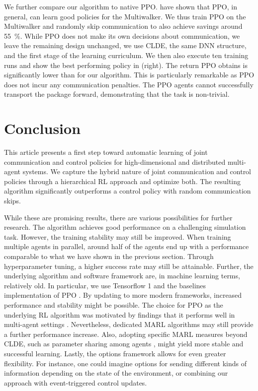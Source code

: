 \documentclass[12pt, final]{l4dc2023}
\begin{document}
We further compare our algorithm to native PPO.
\cite{kargar2021macrpo} have shown that PPO, in general, can learn good policies for the Multiwalker.
We thus train PPO on the Multiwalker and randomly skip communication to also achieve savings around \SI{55}{\percent}.
While PPO does not make its own decisions about communication, we leave the remaining design unchanged, \ie we use CLDE, the same DNN structure, and the first stage of the learning curriculum.
We then also execute ten training runs and show the best performing policy in  (right). 
The return PPO obtains is significantly lower than for our algorithm.
This is particularly remarkable as PPO does not incur any communication penalties.
The PPO agents cannot successfully transport the package forward, demonstrating that the task is non-trivial.


\section{Conclusion}
This article presents a first step toward automatic learning of joint communication and control policies for high-dimensional and distributed multi-agent systems.
We capture the hybrid nature of joint communication and control policies through a hierarchical RL approach and optimize both.
The resulting algorithm significantly outperforms a control policy with random communication skips.

While these are promising results, there are various possibilities for further research.
The algorithm achieves good performance on a challenging simulation task.
However, the training stability may still be improved.
When training multiple agents in parallel, around half of the agents end up with a performance comparable to what we have shown in the previous section.
Through hyperparameter tuning, a higher success rate may still be attainable.
Further, the underlying algorithm and software framework are, in machine learning terms, relatively old.
In particular, we use Tensorflow 1 \citep{abadi2016tensorflow} and the baselines \citep{stable-baselines} implementation of PPO \citep{PPO}.
By updating to more modern frameworks, increased performance and stability might be possible.
The choice for PPO as the underlying RL algorithm was motivated by findings that it performs well in multi-agent settings \citep{yu2021surprising}.
Nevertheless, dedicated MARL algorithms may still provide a further performance increase.
Also, adopting specific MARL measures beyond CLDE, such as parameter sharing among agents \citep{christianos2021scaling}, might yield more stable and successful learning.
Lastly, the options framework allows for even greater flexibility.
For instance, one could imagine options for sending different kinds of information depending on the state of the environment, or combining our approach with event-triggered control updates.
\end{document}
